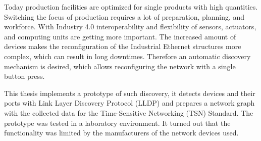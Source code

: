 Today production facilities are optimized for single products with high quantities. Switching the focus of production requires a lot of preparation, planning, and workforce. With Industry 4.0 interoperability and flexibility of sensors, actuators, and computing units are getting more important. The increased amount of devices makes the reconfiguration of the Industrial Ethernet structures more complex, which can result in long downtimes. Therefore an automatic discovery mechanism is desired, which allows reconfiguring the network with a single button press.

This thesis implements a prototype of such discovery, it detects devices and their ports with Link Layer Discovery Protocol (LLDP) and prepares a network graph with the collected data for the Time-Sensitive Networking (TSN) Standard. The prototype was tested in a laboratory environment. It turned out that the functionality was limited by the manufacturers of the network devices used.